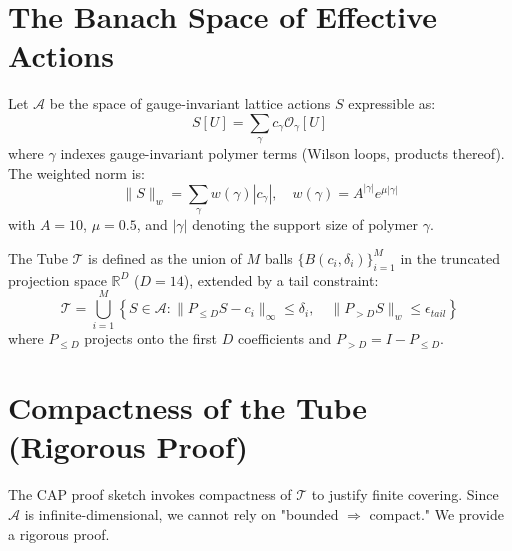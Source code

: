 \section{The Banach Space of Effective Actions}
\label{sec:banach_space}

\begin{definition}
\label{def:weighted_norm}
Let $\mathcal{A}$ be the space of gauge-invariant lattice actions $S$ expressible as:
\begin{equation}
S[U] = \sum_{\gamma} c_\gamma \mathcal{O}_\gamma[U]
\end{equation}
where $\gamma$ indexes gauge-invariant polymer terms (Wilson loops, products thereof). The weighted norm is:
\begin{equation}
\| S \|_w = \sum_{\gamma} w(\gamma) |c_\gamma|, \quad w(\gamma) = A^{|\gamma|} e^{\mu |\gamma|}
\end{equation}
with $A=10$, $\mu=0.5$, and $|\gamma|$ denoting the support size of polymer $\gamma$.
\end{definition}

\begin{definition}
\label{def:tube_compact}
The Tube $\mathcal{T}$ is defined as the union of $M$ balls $\{B(c_i, \delta_i)\}_{i=1}^M$ in the truncated projection space $\mathbb{R}^D$ ($D=14$), extended by a tail constraint:
\begin{equation}
\mathcal{T} = \bigcup_{i=1}^M \left\{ S \in \mathcal{A} : \| P_{\le D} S - c_i \|_{\infty} \le \delta_i, \quad \| P_{>D} S \|_w \le \epsilon_{tail} \right\}
\end{equation}
where $P_{\le D}$ projects onto the first $D$ coefficients and $P_{>D} = I - P_{\le D}$.
\end{definition}

\section{Compactness of the Tube (Rigorous Proof)}
\label{sec:tube_compactness}

The CAP proof sketch invokes compactness of $\mathcal{T}$ to justify finite covering. Since $\mathcal{A}$ is infinite-dimensional, we cannot rely on "bounded $\Rightarrow$ compact." We provide a rigorous proof.

